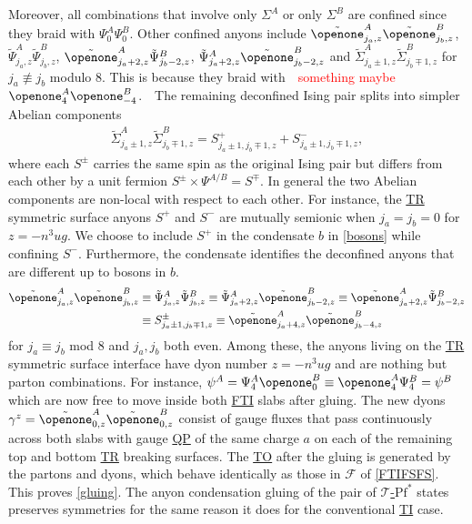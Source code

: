 \documentclass[aps,prl,onecolumn,superscriptaddress,floatfix,12pt,letterpaper,showpacs]{revtex4-1}
\newcommand{\TI}{\hyperlink{TI}{TI} }
\newcommand{\FTI}{\hyperlink{FTI}{FTI} }
\newcommand{\TR}{\hyperlink{TR}{TR} }
\newcommand{\QP}{\hyperlink{QP}{QP} }
\newcommand{\TO}{\hyperlink{TO}{TO} }
\newcommand{\TPf}{\hyperlink{TPf}{$\mathcal{T}$-$\mathrm{Pf}^\ast$} }
\begin{document}
 Moreover, all combinations that involve only $\Sigma^A$ or only $\Sigma^B$ are confined since they braid with $\Psi^A_0\Psi^B_0$. Other confined anyons include $\tilde\openone^A_{j_a,z}\tilde\openone^B_{j_b,z}$, $\tilde\Psi^A_{j_a,z}\tilde\Psi^B_{j_b,z}$, $\tilde\openone^A_{j_a+2,z}\tilde\Psi^B_{j_b-2,z}$, $\tilde\Psi^A_{j_a+2,z}\tilde\openone^B_{j_b-2,z}$ and $\tilde\Sigma^A_{j_a\pm1,z}\tilde\Sigma^B_{j_b\mp1,z}$ for $j_a\not\equiv j_b$ modulo 8. This is because they braid with\
\
\textcolor{red}{something maybe  $\openone^A_{4}\openone^B_{-4}$}.\
\
The remaining deconfined Ising pair splits into simpler Abelian components \begin{align}\tilde\Sigma^A_{j_a\pm1,z}\tilde\Sigma^B_{j_b\mp1,z}=S^+_{j_a\pm1,j_b\mp1,z}+S^-_{j_a\pm1,j_b\mp1,z},\end{align} where each $S^\pm$ carries the same spin as the original Ising pair but differs from each other by a unit fermion $S^\pm\times\Psi^{A/B}=S^\mp$. In general the two Abelian components are non-local with respect to each other. For instance, the \TR symmetric surface anyons $S^+$ and $S^-$ are mutually semionic when $j_a=j_b=0$ for $z=-n^3ug$. We choose to include $S^+$ in the condensate $b$ in \eqref{bosons} while confining $S^-$. Furthermore, the condensate identifies the deconfined anyons that are different up to bosons in $b$. \begin{align}\tilde\openone^A_{j_a,z}\tilde\openone^B_{j_b,z}&\equiv\tilde\Psi^A_{j_a,z}\tilde\Psi^B_{j_b,z}\equiv\tilde\Psi^A_{j_a+2,z}\tilde\openone^B_{j_b-2,z}\equiv\tilde\openone^A_{j_a+2,z}\tilde\Psi^B_{j_b-2,z}\nonumber\\&\equiv S^\pm_{j_a\pm1,j_b\mp1,z}\equiv\tilde\openone^A_{j_a+4,z}\tilde\openone^B_{j_b-4,z}\label{bulk}\end{align} for $j_a\equiv j_b$ mod 8 and $j_a,j_b$ both even. Among these, the anyons living on the \TR symmetric surface interface have dyon number $z=-n^3ug$ and are nothing but parton combinations. For instance, $\psi^A=\Psi^A_4\openone^B_0\equiv\openone^A_4\Psi^B_4=\psi^B$ which are now free to move inside both \FTI slabs after gluing. The new dyons $\gamma^z=\tilde\openone^A_{0,z}\tilde\openone^B_{0,z}$ consist of gauge fluxes that pass continuously across both slabs with gauge \QP of the same charge $a$ on each of the remaining top and bottom \TR breaking surfaces. The \TO after the gluing is generated by the partons and dyons, which behave identically as those in $\mathcal{F}$ of \eqref{FTIFSFS}. This proves \eqref{gluing}. The anyon condensation gluing of the pair of \TPf states preserves symmetries for the same reason it does for the conventional \TI case.
\end{document}

